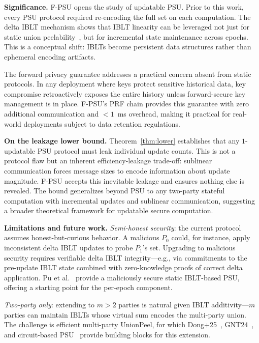 \documentclass[letterpaper,twocolumn,10pt]{article}
\theoremstyle{definition}
\begin{document}
\smallskip\noindent\textbf{Significance.}
F-PSU opens the study of updatable PSU. Prior to this work, every PSU protocol
required re-encoding the full set on each computation. The delta IBLT mechanism
shows that IBLT linearity can be leveraged not just for static union
peelability~\cite{PT26}, but for incremental state maintenance across epochs.
This is a conceptual shift: IBLTs become persistent data structures rather than
ephemeral encoding artifacts.

The forward privacy guarantee addresses a practical concern absent from static
protocols. In any deployment where keys protect sensitive historical data, key
compromise retroactively exposes the entire history unless forward-secure key
management is in place. F-PSU's PRF chain provides this guarantee with zero
additional communication and $<1$~ms overhead, making it practical for
real-world deployments subject to data retention regulations.

\smallskip\noindent\textbf{On the leakage lower bound.}
Theorem~\ref{thm:lower} establishes that any $1$-updatable PSU protocol must
leak individual update counts. This is not a protocol flaw but an inherent
efficiency-leakage trade-off: sublinear communication forces message sizes to
encode information about update magnitude. F-PSU accepts this inevitable
leakage and ensures nothing else is revealed. The bound generalizes beyond
PSU to any two-party stateful computation with incremental updates and
sublinear communication, suggesting a broader theoretical framework for
updatable secure computation.

\smallskip\noindent\textbf{Limitations and future work.}
\emph{Semi-honest security}: the current protocol assumes honest-but-curious
behavior. A malicious $P_0$ could, for instance, apply inconsistent delta IBLT
updates to probe $P_1$'s set. Upgrading to malicious security requires
verifiable delta IBLT integrity---e.g., via commitments to the pre-update IBLT
state combined with zero-knowledge proofs of correct delta application.
Pu et al.~\cite{PuGT26} provide a maliciously secure static IBLT-based PSU,
offering a starting point for the per-epoch component.

\emph{Two-party only}: extending to $m > 2$ parties is natural given IBLT
additivity---$m$ parties can maintain IBLTs whose virtual sum encodes the
multi-party union. The challenge is efficient multi-party UnionPeel, for which
Dong+25~\cite{Dong+25}, GNT24~\cite{GNT24}, and circuit-based PSU~\cite{CGS24} provide building blocks for this extension.
\end{document}
